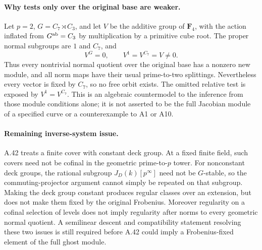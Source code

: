 \documentclass[11pt]{article}
\begin{document}
\paragraph{Why tests only over the original base are weaker.}
Let \(p=2\), \(G=C_7\rtimes C_3\), and let \(V\) be
the additive group of \(\mathbf F_4\), with the action
inflated from \(G^{\rm ab}=C_3\) by multiplication by
a primitive cube root. The proper normal subgroups
are \(1\) and \(C_7\), and
\[
                     V^G=0,\qquad
                     V^1=V^{C_7}=V\ne0.
\]
Thus every nontrivial normal quotient over the original
base has a nonzero new module, and all norm maps have
their usual prime-to-two splittings. Nevertheless every
vector is fixed by \(C_7\), so no free orbit exists.
The omitted relative test is exposed by
\(V^1=V^{C_7}\). This is an algebraic countermodel to
the inference from those module conditions alone;
it is not asserted to be the full Jacobian module of
a specified curve or a counterexample to A1 or A10.

\paragraph{Remaining inverse-system issue.}
A.42 treats a finite cover with constant deck group.
At a fixed finite field, such covers need not be
cofinal in the geometric prime-to-\(p\) tower.
For nonconstant deck groups, the rational subgroup
\(J_D(k)[p^\infty]\) need not be \(G\)-stable, so the
commuting-projector argument cannot simply be repeated
on that subgroup. Making the deck group constant
produces regular classes over an extension, but does
not make them fixed by the original Frobenius.
Moreover regularity on a cofinal selection of levels
does not imply regularity after norms to every
geometric normal quotient. A semilinear descent and
compatibility statement resolving these two issues
is still required before A.42 could imply a
Frobenius-fixed element of the full ghost module.
\end{document}
